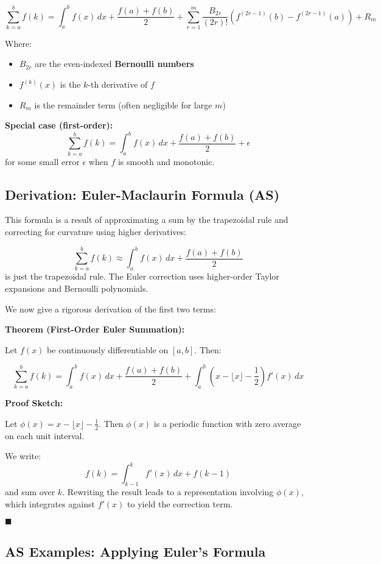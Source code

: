 \documentclass{article}
\begin{document}
\[
\sum_{k=a}^{b} f(k) = \int_a^b f(x)\,dx + \frac{f(a) + f(b)}{2} + \sum_{r=1}^{m} \frac{B_{2r}}{(2r)!} \left( f^{(2r-1)}(b) - f^{(2r-1)}(a) \right) + R_m
\]

Where:
\begin{itemize}
    \item $B_{2r}$ are the even-indexed \textbf{Bernoulli numbers}
    \item $f^{(k)}(x)$ is the $k$-th derivative of $f$
    \item $R_m$ is the remainder term (often negligible for large $m$)
\end{itemize}

\textbf{Special case (first-order):}
\[
\sum_{k=a}^{b} f(k) = \int_a^b f(x)\,dx + \frac{f(a) + f(b)}{2} + \epsilon
\]
for some small error $\epsilon$ when $f$ is smooth and monotonic.

\subsection*{Derivation: Euler-Maclaurin Formula (AS)}

This formula is a result of approximating a sum by the trapezoidal rule and correcting for curvature using higher derivatives:

\[
\sum_{k=a}^b f(k) \approx \int_a^b f(x)\,dx + \frac{f(a) + f(b)}{2}
\]
is just the trapezoidal rule. The Euler correction uses higher-order Taylor expansions and Bernoulli polynomials.

We now give a rigorous derivation of the first two terms:

\textbf{Theorem (First-Order Euler Summation):}

Let $f(x)$ be continuously differentiable on $[a,b]$. Then:

\[
\sum_{k=a}^b f(k) = \int_a^b f(x)\,dx + \frac{f(a) + f(b)}{2} + \int_a^b \left(x - \lfloor x \rfloor - \frac{1}{2}\right) f'(x)\,dx
\]

\textbf{Proof Sketch:}

Let $\phi(x) = x - \lfloor x \rfloor - \frac{1}{2}$. Then $\phi(x)$ is a periodic function with zero average on each unit interval.

We write:
\[
f(k) = \int_{k-1}^{k} f'(x)\,dx + f(k-1)
\]
and sum over $k$. Rewriting the result leads to a representation involving $\phi(x)$, which integrates against $f'(x)$ to yield the correction term.

$\blacksquare$

\subsection*{AS Examples: Applying Euler’s Formula}
\end{document}
